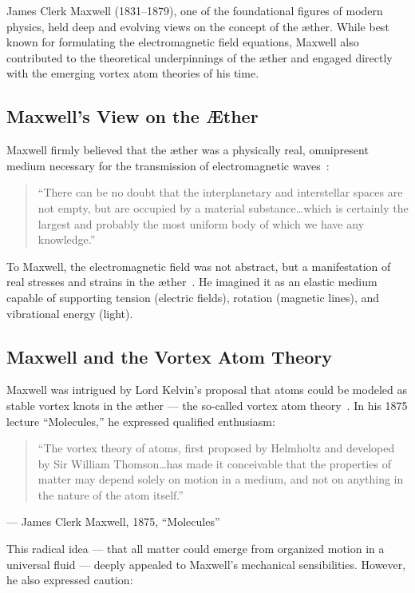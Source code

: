  James Clerk Maxwell (1831–1879), one of the foundational figures of modern physics, held deep and evolving views on the concept of the æther. While best known for formulating the electromagnetic field equations, Maxwell also contributed to the theoretical underpinnings of the æther and engaged directly with the emerging vortex atom theories of his time.

 \subsection*{Maxwell's View on the Æther}
 Maxwell firmly believed that the æther was a physically real, omnipresent medium necessary for the transmission of electromagnetic waves~\cite{maxwell1878britannica}:

 \begin{quote}
 ``There can be no doubt that the interplanetary and interstellar spaces are not empty, but are occupied by a material substance\ldots which is certainly the largest and probably the most uniform body of which we have any knowledge.''
 \end{quote}

 To Maxwell, the electromagnetic field was not abstract, but a manifestation of real stresses and strains in the æther~\cite{maxwell1878britannica}. He imagined it as an elastic medium capable of supporting tension (electric fields), rotation (magnetic lines), and vibrational energy (light).

 \subsection*{Maxwell and the Vortex Atom Theory}

 Maxwell was intrigued by Lord Kelvin's proposal that atoms could be modeled as stable vortex knots in the æther — the so-called vortex atom theory~\cite{maxwell1875molecules}. In his 1875 lecture ``Molecules,'' he expressed qualified enthusiasm:

 \begin{quote}
 ``The vortex theory of atoms, first proposed by Helmholtz and developed by Sir William Thomson\ldots has made it conceivable that the properties of matter may depend solely on motion in a medium, and not on anything in the nature of the atom itself.''
 \end{quote}
\hfill — James Clerk Maxwell, 1875, ``Molecules''

 This radical idea — that all matter could emerge from organized motion in a universal fluid — deeply appealed to Maxwell's mechanical sensibilities. However, he also expressed caution:

